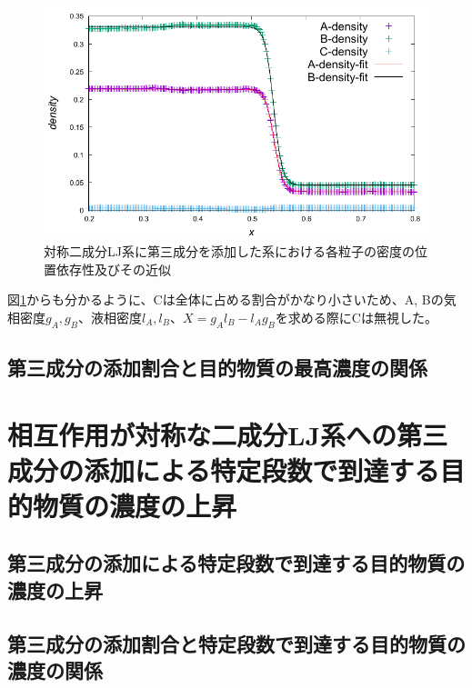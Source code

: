 \documentclass[titlepage]{jsreport}
\begin{document}
\begin{figure}[htbp]
    \begin{center}
        \includegraphics[width=14cm]{fig/lan278176-lbn417263-lcn7025-ran7782-rbn11673-rcn197/lan278176-lbn417263-lcn7025-ran7782-rbn11673-rcn197-fitting.pdf}
    \end{center}
    \caption{対称二成分LJ系に第三成分を添加した系における各粒子の密度の位置依存性及びその近似}
    \label{fig:lan278176-lbn417263-lcn7025-ran7782-rbn11673-rcn197-fitting}
\end{figure}

図\ref{fig:lan278176-lbn417263-lcn7025-ran7782-rbn11673-rcn197-fitting}からも分かるように、Cは全体に占める割合がかなり小さいため、A, Bの気相密度$g_A, g_B$、液相密度$l_A, l_B$、$X=g_Al_B-l_Ag_B$を求める際にCは無視した。


\subsection{第三成分の添加割合と目的物質の最高濃度の関係} \label{results-subsec:bi-component-addition-of-3rd-component-addition-ratio-highest-purity}


\section{相互作用が対称な二成分LJ系への第三成分の添加による特定段数で到達する目的物質の濃度の上昇} \label{results-sec:bi-component-addition-of-3rd-component-steps}
\subsection{第三成分の添加による特定段数で到達する目的物質の濃度の上昇} \label{results-subsec:bi-component-addition-of-3rd-component-steps}
\subsection{第三成分の添加割合と特定段数で到達する目的物質の濃度の関係} \label{results-subsec:bi-component-addition-of-3rd-component-addition-ratio-steps}
\end{document}
